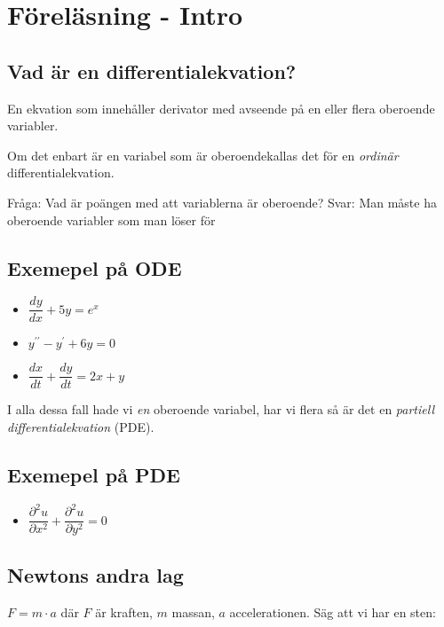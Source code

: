 \section{Föreläsning - Intro}
\subsection{Vad är en differentialekvation?}
\par\bigskip


\noindent En ekvation som innehåller derivator med avseende på en eller flera oberoende variabler.\par
Om det enbart är en variabel som är oberoendekallas det för en \textit{ordinär} differentialekvation.

Fråga: Vad är poängen med att variablerna är oberoende?
Svar: Man måste ha oberoende variabler som man löser för

\subsection{Exemepel på ODE}
\begin{itemize}
  \item $\dfrac{dy}{dx} + 5y = e^x$
  \item $y^{\prime\prime}-y^{\prime}+6y=0$
  \item $\dfrac{dx}{dt}+\dfrac{dy}{dt}=2x+y$
\end{itemize}
\par\bigskip

\noindent I alla dessa fall hade vi \textit{en} oberoende variabel, har vi flera så är det en \textit{partiell differentialekvation} (PDE).

\subsection{Exemepel på PDE}

\begin{itemize}
  \item $\dfrac{\partial^2u}{\partial x^2}+\dfrac{\partial^2u}{\partial y^2}=0$
\end{itemize}

\subsection{Newtons andra lag}
\par\bigskip

$F=m\cdot a$ där $F$ är kraften, $m$ massan, $a$ accelerationen.
Säg att vi har en sten:

